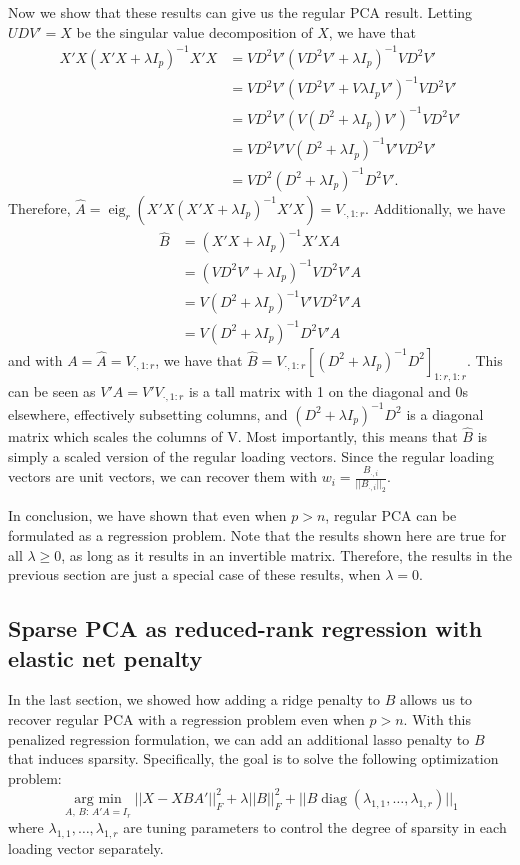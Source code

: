 \documentclass[11pt]{article}
\newcommand{\argmin}{\operatorname*{arg \ min}}
\newcommand{\eig}{\operatorname*{eig}}
\newcommand{\diag}{\operatorname*{diag}}
\begin{document}
Now we show that these results can give us the regular PCA result. Letting $UDV' = X$ be the singular value decomposition of $X$, we have that \begin{align*}
X'X(X'X + \lambda I_p)^{-1}X'X &= VD^2V'(VD^2V' + \lambda I_p)^{-1}VD^2V' \\
&= VD^2V'(VD^2V' + V\lambda I_pV')^{-1}VD^2V' \\
&= VD^2V'(V(D^2 + \lambda I_p)V')^{-1}VD^2V' \\
&= VD^2V'V(D^2 + \lambda I_p)^{-1}V'VD^2V' \\
&= VD^2(D^2 + \lambda I_p)^{-1}D^2V'.
\end{align*}
Therefore, $\hat{A} = \eig_r(X'X(X'X + \lambda I_p)^{-1}X'X) = V_{\cdot, 1:r}$. Additionally, we have
\begin{align*}
\hat{B} &= (X'X + \lambda I_p)^{-1}X'XA \\
&= (VD^2V' + \lambda I_p)^{-1}VD^2V'A \\
&= V(D^2  + \lambda I_p)^{-1}V'VD^2V'A \\
&= V(D^2  + \lambda I_p)^{-1}D^2V'A
\end{align*}
and with $A = \hat{A} = V_{\cdot, 1:r}$, we have that $\hat{B} = V_{\cdot, 1:r}\left[(D^2  + \lambda I_p)^{-1}D^2\right]_{1:r, 1:r}$. This can be seen as $V'A = V'V_{\cdot, 1:r}$ is a tall matrix with 1 on the diagonal and 0s elsewhere, effectively subsetting columns, and $(D^2  + \lambda I_p)^{-1}D^2$ is a diagonal matrix which scales the columns of V. Most importantly, this means that $\hat{B}$ is simply a scaled version of the regular loading vectors. Since the regular loading vectors are unit vectors, we can recover them with $w_i = \frac{B_{\cdot, i}}{||B_{\cdot, i}||_2}$. 

In conclusion, we have shown that even when $p > n$, regular PCA can be formulated as a regression problem. Note that the results shown here are true for all $\lambda \geq 0$, as long as it results in an invertible matrix. Therefore, the results in the previous section are just a special case of these results, when $\lambda = 0$. 
\subsection{Sparse PCA as reduced-rank regression with elastic net penalty}
In the last section, we showed how adding a ridge penalty to $B$ allows us to recover regular PCA with a regression problem even when $p > n$. With this penalized regression formulation, we can add an additional lasso penalty to $B$ that induces sparsity. Specifically, the goal is to solve the following optimization problem:
\begin{equation*}
\argmin_{A, \,B: \,A'A = I_r} ||X - XBA'||_F^2 + \lambda||B||_F^2 + ||B\diag(\lambda_{1, 1}, \dots, \lambda_{1, r})||_1
\end{equation*}
where $\lambda_{1, 1}, \dots, \lambda_{1, r}$ are tuning parameters to control the degree of sparsity in each loading vector separately. 
\end{document}
